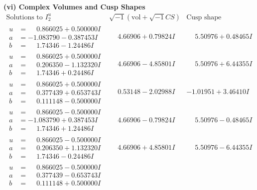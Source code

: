 \documentclass[1p]{elsarticle_modified}
\theoremstyle{definition}
\newcommand{\I}{\sqrt{-1}}
\begin{document}
\newpage\flushleft \textbf{(vi) Complex Volumes and Cusp Shapes}
$$\begin{array}{c|c|c}  
\text{Solutions to }I^u_{2}& \I (\text{vol} + \sqrt{-1}CS) & \text{Cusp shape}\\
 \hline 
\begin{aligned}
u &= \phantom{-}0.866025 + 0.500000 I \\
a &= -1.083790 - 0.387453 I \\
b &= \phantom{-}1.74346 - 1.24486 I\end{aligned}
 & \phantom{-}4.66906 + 0.79824 I & \phantom{-}5.50976 + 0.48465 I \\ \hline\begin{aligned}
u &= \phantom{-}0.866025 + 0.500000 I \\
a &= \phantom{-}0.206350 - 1.132320 I \\
b &= \phantom{-}1.74346 + 0.24486 I\end{aligned}
 & \phantom{-}4.66906 - 4.85801 I & \phantom{-}5.50976 + 6.44355 I \\ \hline\begin{aligned}
u &= \phantom{-}0.866025 + 0.500000 I \\
a &= \phantom{-}0.377439 + 0.653743 I \\
b &= \phantom{-}0.111148 - 0.500000 I\end{aligned}
 & \phantom{-}0.53148 - 2.02988 I & -1.01951 + 3.46410 I \\ \hline\begin{aligned}
u &= \phantom{-}0.866025 - 0.500000 I \\
a &= -1.083790 + 0.387453 I \\
b &= \phantom{-}1.74346 + 1.24486 I\end{aligned}
 & \phantom{-}4.66906 - 0.79824 I & \phantom{-}5.50976 - 0.48465 I \\ \hline\begin{aligned}
u &= \phantom{-}0.866025 - 0.500000 I \\
a &= \phantom{-}0.206350 + 1.132320 I \\
b &= \phantom{-}1.74346 - 0.24486 I\end{aligned}
 & \phantom{-}4.66906 + 4.85801 I & \phantom{-}5.50976 - 6.44355 I \\ \hline\begin{aligned}
u &= \phantom{-}0.866025 - 0.500000 I \\
a &= \phantom{-}0.377439 - 0.653743 I \\
b &= \phantom{-}0.111148 + 0.500000 I\end{aligned}

\end{array}$$
\end{document}
